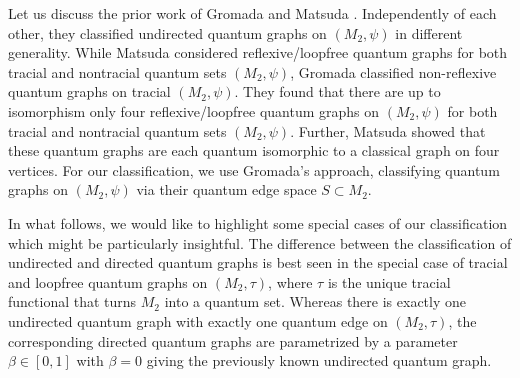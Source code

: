 \documentclass{amsart}
\begin{document}
Let us discuss the prior work of Gromada and Matsuda \cite{gromada_examples_2022,matsuda_classification_2022}. Independently of each other, they classified undirected quantum graphs on $(M_2, \psi)$ in different generality. While Matsuda considered reflexive/loopfree quantum graphs for both tracial and nontracial quantum sets $(M_2, \psi)$, Gromada classified non-reflexive quantum graphs on tracial $(M_2, \psi)$. They found that there are up to isomorphism only four reflexive/loopfree quantum graphs on $(M_2, \psi)$ for both tracial and nontracial quantum sets $(M_2, \psi)$. 
Further, Matsuda showed that these quantum graphs are each quantum isomorphic to a classical graph on four vertices. For our classification, we use Gromada's approach, classifying quantum graphs on $(M_2, \psi)$ via their quantum edge space $S \subset M_2$.






In what follows, we would like to highlight some special cases of our classification which might be particularly insightful. The difference between the classification of undirected and directed quantum graphs is best seen in the special case of tracial and loopfree quantum graphs on $(M_2, \tau)$, where $\tau$ is the unique tracial functional that turns $M_2$ into a quantum set. Whereas there is exactly one undirected quantum graph with exactly one quantum edge on $(M_2, \tau)$, the corresponding directed quantum graphs are parametrized by a parameter $\beta \in [0,1]$ with $\beta = 0$ giving the previously known undirected quantum graph.
\end{document}
